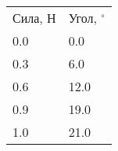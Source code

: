 \begin{tabular}{ll}
\hline
 Сила, Н & Угол, $^\circ$ \\
 0.0     & 0.0            \\
 0.3     & 6.0            \\
 0.6     & 12.0           \\
 0.9     & 19.0           \\
 1.0     & 21.0           \\
\hline
\end{tabular}